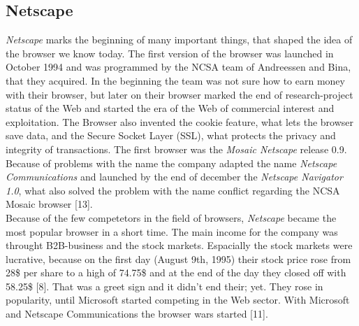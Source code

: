 \documentclass[runningheads]{llncs}
\begin{document}
		\subsection{Netscape}
		\textit{Netscape} marks the beginning of many important things, that shaped the idea of the browser we know today. The first version of the browser was launched in October 1994 and was programmed by the NCSA team of Andreessen and Bina, that they acquired. In the beginning the team was not sure how to earn money with their browser, but later on their browser marked the end of research-project status of the Web and started the era of the Web of commercial interest and exploitation. The Browser also invented the cookie feature, what lets the browser save data, and the Secure Socket Layer (SSL), what protects the privacy  and integrity of transactions. The first browser was the \textit{Mosaic Netscape} release 0.9. Because of problems with the name the company adapted the name \textit{Netscape Communications} and launched by the end of december the \textit{Netscape Navigator 1.0}, what also solved the problem with the name conflict regarding the NCSA Mosaic browser [13].
		\\Because of the few competetors in the field of browsers, \textit{Netscape} became the most popular browser in a short time. The main income for the company was throught B2B-business and the stock markets. Espacially the stock markets were lucrative, because on the first day (August 9th, 1995) their stock price rose from 28\$ per share to a high of 74.75\$ and at the end of the day they closed off with 58.25\$ [8]. That was a greet sign and it didn't end their; yet. They rose in popularity, until Microsoft started competing in the Web sector. With Microsoft and Netscape Communications the browser wars started [11].
\end{document}
